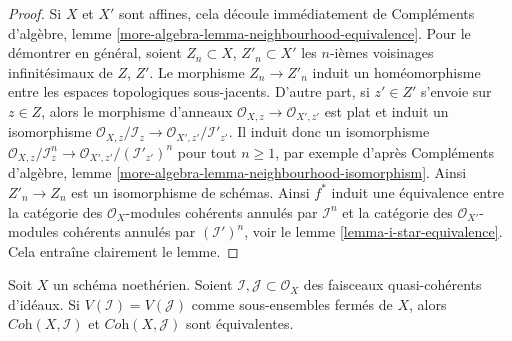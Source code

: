 \begin{proof}
Si $X$ et $X'$ sont affines, cela découle immédiatement de
Compléments d'algèbre, lemme \ref{more-algebra-lemma-neighbourhood-equivalence}.
Pour le démontrer en général, soient $Z_n \subset X$, $Z'_n \subset X'$
les $n$-ièmes voisinages infinitésimaux de $Z$, $Z'$.
Le morphisme $Z_n \to Z'_n$ induit un homéomorphisme entre
les espaces topologiques sous-jacents. D'autre part, si $z' \in Z'$
s'envoie sur $z \in Z$, alors le morphisme d'anneaux
$\mathcal{O}_{X, z} \to \mathcal{O}_{X', z'}$ est plat
et induit un isomorphisme
$\mathcal{O}_{X, z}/\mathcal{I}_z \to \mathcal{O}_{X', z'}/\mathcal{I}'_{z'}$.
Il induit donc un isomorphisme
$\mathcal{O}_{X, z}/\mathcal{I}_z^n \to
\mathcal{O}_{X', z'}/(\mathcal{I}'_{z'})^n$
pour tout $n \geq 1$, par exemple
d'après Compléments d'algèbre, lemme \ref{more-algebra-lemma-neighbourhood-isomorphism}.
Ainsi $Z'_n \to Z_n$ est un isomorphisme de schémas.
Ainsi $f^*$ induit une équivalence entre
la catégorie des $\mathcal{O}_X$-modules cohérents annulés par $\mathcal{I}^n$
et la
catégorie des $\mathcal{O}_{X'}$-modules cohérents annulés par
$(\mathcal{I}')^n$, voir le
lemme \ref{lemma-i-star-equivalence}.
Cela entraîne clairement le lemme.
\end{proof}

\begin{lemma}
\label{lemma-inverse-systems-ideals-equivalence}
Soit $X$ un schéma noethérien. Soient
$\mathcal{I}, \mathcal{J} \subset \mathcal{O}_X$
des faisceaux quasi-cohérents d'idéaux.
Si $V(\mathcal{I}) = V(\mathcal{J})$ comme sous-ensembles fermés
de $X$, alors $\textit{Coh}(X, \mathcal{I})$ et $\textit{Coh}(X, \mathcal{J})$
sont équivalentes.
\end{lemma}

